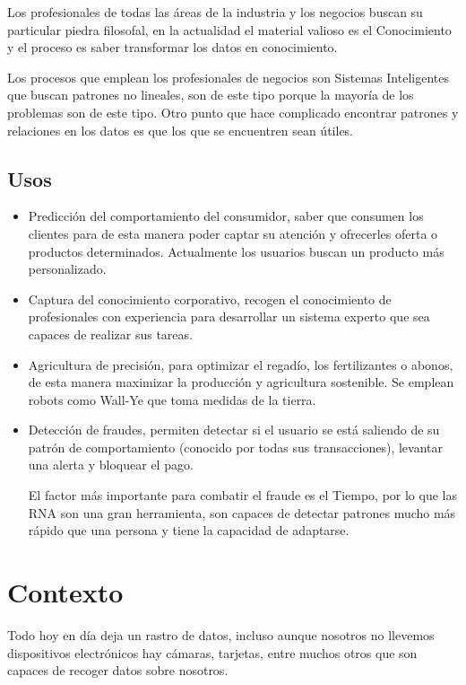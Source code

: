 \documentclass[12pt, twoside, openright]{report} %
\begin{document}
Los profesionales de todas las áreas de la industria y los negocios buscan su particular piedra filosofal, en la actualidad el material valioso es el Conocimiento y el proceso es saber transformar los datos en conocimiento.

Los procesos que emplean los profesionales de negocios son Sistemas Inteligentes que buscan patrones no lineales, son de este tipo porque la mayoría de los problemas son de este tipo. Otro punto que hace complicado encontrar patrones y relaciones en los datos es que los que se encuentren sean útiles.

\subsection{Usos}
\begin{itemize}
	\item Predicción del comportamiento del consumidor, saber que consumen los clientes para de esta manera poder captar su atención y ofrecerles oferta o productos determinados. Actualmente los usuarios buscan un producto más personalizado.
	\item Captura del conocimiento corporativo, recogen el conocimiento de profesionales con experiencia para desarrollar un sistema experto que sea capaces de realizar sus tareas.
	\item Agricultura de precisión, para optimizar el regadío, los fertilizantes o abonos, de esta manera maximizar la producción y agricultura sostenible. Se emplean robots como Wall-Ye que toma medidas de la tierra.
	\item Detección de fraudes, permiten detectar si el usuario se está saliendo de su patrón de comportamiento (conocido por todas sus transacciones), levantar una alerta y bloquear el pago.
	      
	      El factor más importante para combatir el fraude es el Tiempo, por lo que las RNA son una gran herramienta, son capaces de detectar patrones mucho más rápido que una persona y tiene la capacidad de adaptarse.
\end{itemize}
\pagebreak

\section{Contexto}
Todo hoy en día deja un rastro de datos, incluso aunque nosotros no llevemos dispositivos electrónicos hay cámaras, tarjetas, entre muchos otros que son capaces de recoger datos sobre nosotros.
\end{document}
